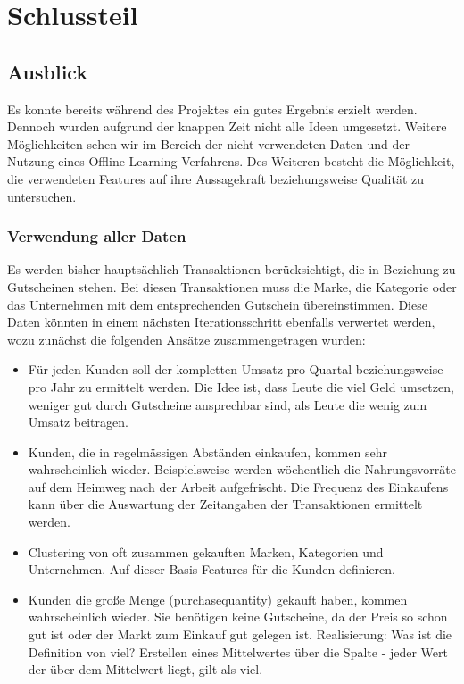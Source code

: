\section{Schlussteil}

\subsection{Ausblick}

Es konnte bereits während des Projektes ein gutes Ergebnis erzielt
werden. Dennoch wurden aufgrund der knappen Zeit nicht alle Ideen
umgesetzt. Weitere Möglichkeiten sehen wir im Bereich der nicht
verwendeten Daten und der Nutzung eines Offline-Learning-Verfahrens.
Des Weiteren besteht die Möglichkeit, die verwendeten Features auf ihre
Aussagekraft beziehungsweise Qualität zu untersuchen.

\subsubsection{Verwendung aller Daten}
Es werden bisher hauptsächlich Transaktionen berücksichtigt, die in Beziehung zu Gutscheinen stehen.
Bei diesen Transaktionen muss die Marke, die Kategorie oder das Unternehmen mit dem entsprechenden Gutschein übereinstimmen.
Diese Daten könnten in einem nächsten Iterationsschritt ebenfalls verwertet werden, wozu zunächst die folgenden Ansätze zusammengetragen wurden:
	
\begin{itemize}
\item Für jeden Kunden soll der kompletten Umsatz pro Quartal beziehungsweise pro Jahr zu ermittelt werden. 
Die Idee ist, dass Leute die viel Geld umsetzen, weniger gut durch Gutscheine ansprechbar sind, als Leute die wenig zum Umsatz beitragen. 
 
\item Kunden, die in regelmässigen Abständen einkaufen, kommen sehr wahrscheinlich wieder.
Beispielsweise werden wöchentlich die Nahrungsvorräte auf dem Heimweg nach der Arbeit aufgefrischt.
Die Frequenz des Einkaufens kann über die Auswartung der Zeitangaben der Transaktionen ermittelt werden.

\item Clustering von oft zusammen gekauften Marken, Kategorien und Unternehmen.
Auf dieser Basis Features für die Kunden definieren.
	
\item Kunden die große Menge (purchasequantity) gekauft haben, kommen wahrscheinlich wieder. 
Sie benötigen keine Gutscheine, da der Preis so schon gut ist oder der Markt zum Einkauf gut gelegen ist. 
Realisierung: Was ist die Definition von viel? 
Erstellen eines Mittelwertes über die Spalte - jeder Wert der über dem Mittelwert liegt, gilt als viel.
\end{itemize}


